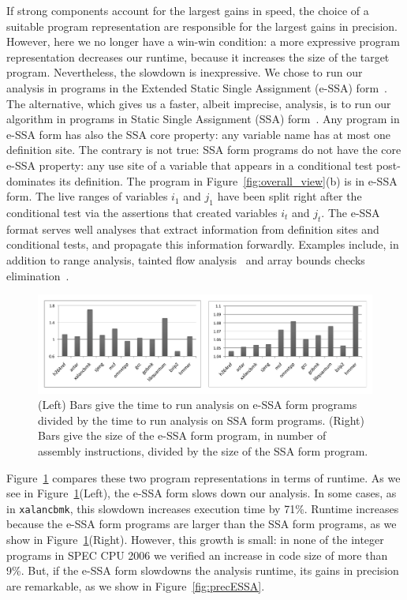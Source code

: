 \documentclass{paper}
\begin{document}
If strong components account for the largest gains in speed, the choice of
a suitable program representation are responsible for the largest gains in
precision.
However, here we no longer have a win-win condition: a more expressive
program representation decreases our runtime, because it increases the
size of the target program.
Nevertheless, the slowdown is inexpressive.
We chose to run our analysis in programs in the Extended Static Single
Assignment (e-SSA) form~\cite{Bodik00}.
The alternative, which gives us a faster, albeit imprecise, analysis, is to run
our algorithm in programs in Static Single Assignment (SSA)
form~\cite{Cytron91}.
Any program in e-SSA form has also the SSA core property: any variable name
has at most one definition site.
The contrary is not true: SSA form programs do not have the core e-SSA
property: any use site of a variable that appears in a conditional test
post-dominates its definition.
The program in Figure~\ref{fig:overall_view}(b) is in e-SSA form.
The live ranges of variables $i_1$ and $j_1$ have been split right after the
conditional test via the assertions that created variables $i_t$ and $j_t$.
The e-SSA format serves well analyses that extract information from definition
sites and conditional tests, and propagate this information forwardly.
Examples include, in addition to range analysis, tainted flow
analysis~\cite{Rimsa11} and array bounds checks elimination~\cite{Bodik00}.

\begin{figure}[t!]
\begin{center}
\includegraphics[width=1\textwidth]{images/impactESSA}
\end{center}
\caption{\label{fig:impactESSA}
(Left) Bars give the time to run analysis on e-SSA form programs divided by
the time to run analysis on SSA form programs.
(Right) Bars give the size of the e-SSA form program, in number of
assembly instructions, divided by the size of the SSA form program.}
\end{figure}

Figure~\ref{fig:impactESSA} compares these two program representations in
terms of runtime.
As we see in Figure~\ref{fig:impactESSA}(Left), the e-SSA form slows down our
analysis.
In some cases, as in \texttt{xalancbmk}, this slowdown increases execution
time by 71\%.
Runtime increases because the e-SSA form programs are larger than the SSA
form programs, as we show in Figure~\ref{fig:impactESSA}(Right).
However, this growth is small: in none of the integer programs in SPEC
CPU 2006 we verified an increase in code size of more than 9\%.
But, if the e-SSA form slowdowns the analysis runtime, its gains in precision
are remarkable, as we show in Figure~\ref{fig:precESSA}.
\end{document}
